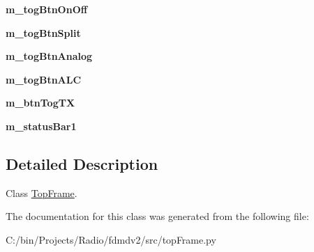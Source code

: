 \begin{DoxyCompactItemize}
\item 
\hypertarget{classtop_frame_1_1_top_frame_a122fda93d64a9934e50f601156afc6b1}{{\bfseries m\-\_\-tog\-Btn\-On\-Off}}\label{classtop_frame_1_1_top_frame_a122fda93d64a9934e50f601156afc6b1}

\item 
\hypertarget{classtop_frame_1_1_top_frame_a6ed46f358625437a0eb6f7ac476d6a81}{{\bfseries m\-\_\-tog\-Btn\-Split}}\label{classtop_frame_1_1_top_frame_a6ed46f358625437a0eb6f7ac476d6a81}

\item 
\hypertarget{classtop_frame_1_1_top_frame_aa70926cafd915b5f89fc3b95f665e4e1}{{\bfseries m\-\_\-tog\-Btn\-Analog}}\label{classtop_frame_1_1_top_frame_aa70926cafd915b5f89fc3b95f665e4e1}

\item 
\hypertarget{classtop_frame_1_1_top_frame_ab1d8a1745d1f459a48d05d06ee691b99}{{\bfseries m\-\_\-tog\-Btn\-A\-L\-C}}\label{classtop_frame_1_1_top_frame_ab1d8a1745d1f459a48d05d06ee691b99}

\item 
\hypertarget{classtop_frame_1_1_top_frame_a31dbffc9065e0bd59e2740d7d0553867}{{\bfseries m\-\_\-btn\-Tog\-T\-X}}\label{classtop_frame_1_1_top_frame_a31dbffc9065e0bd59e2740d7d0553867}

\item 
\hypertarget{classtop_frame_1_1_top_frame_a0a2ae63963c3d388b14a79be1b198371}{{\bfseries m\-\_\-status\-Bar1}}\label{classtop_frame_1_1_top_frame_a0a2ae63963c3d388b14a79be1b198371}

\end{DoxyCompactItemize}


\subsection{Detailed Description}
Class \hyperlink{classtop_frame_1_1_top_frame}{Top\-Frame}. 

The documentation for this class was generated from the following file\-:\begin{DoxyCompactItemize}
\item 
C\-:/bin/\-Projects/\-Radio/fdmdv2/src/top\-Frame.\-py\end{DoxyCompactItemize}
